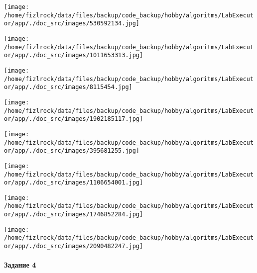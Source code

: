 \documentclass[a4paper, 12pt]{article}
\begin{document}
\texttt{[image: /home/fizlrock/data/files/backup/code\_backup/hobby/algoritms/LabExecutor/app/./doc\_src/images/530592134.jpg]}

\texttt{[image: /home/fizlrock/data/files/backup/code\_backup/hobby/algoritms/LabExecutor/app/./doc\_src/images/1011653313.jpg]}

\texttt{[image: /home/fizlrock/data/files/backup/code\_backup/hobby/algoritms/LabExecutor/app/./doc\_src/images/8115454.jpg]}

\texttt{[image: /home/fizlrock/data/files/backup/code\_backup/hobby/algoritms/LabExecutor/app/./doc\_src/images/1902185117.jpg]}

\texttt{[image: /home/fizlrock/data/files/backup/code\_backup/hobby/algoritms/LabExecutor/app/./doc\_src/images/395681255.jpg]}

\texttt{[image: /home/fizlrock/data/files/backup/code\_backup/hobby/algoritms/LabExecutor/app/./doc\_src/images/1106654001.jpg]}

\texttt{[image: /home/fizlrock/data/files/backup/code\_backup/hobby/algoritms/LabExecutor/app/./doc\_src/images/1746852284.jpg]}

\texttt{[image: /home/fizlrock/data/files/backup/code\_backup/hobby/algoritms/LabExecutor/app/./doc\_src/images/2090482247.jpg]}
\pagebreak
\paragraph{Задание 4}
\end{document}
